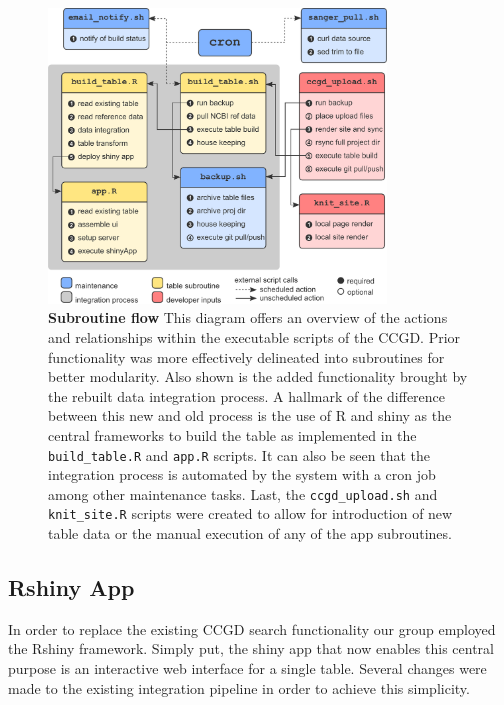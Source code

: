 \documentclass[10pt]{report}
\begin{document}
\begin{figure}[H]
    \center{}
    \includegraphics[width=0.8\textwidth]{fig/subroutine_flow.pdf}
    \caption[Subroutine flow]{\textbf{Subroutine flow} This diagram offers an overview of the actions and relationships within the executable scripts of the CCGD\@. Prior functionality was more effectively delineated into subroutines for better modularity. Also shown is the added functionality brought by the rebuilt data integration process. A hallmark of the difference between this new and old process is the use of R and shiny as the central frameworks to build the table as implemented in the \texttt{build\_table.R} and \texttt{app.R} scripts. It can also be seen that the integration process is automated by the system with a cron job among other maintenance tasks. Last, the \texttt{ccgd\_upload.sh} and \texttt{knit\_site.R} scripts were created to allow for introduction of new table data or the manual execution of any of the app subroutines.}\label{fig:subroutine}
\end{figure}

\subsection{Rshiny App}
In order to replace the existing CCGD search functionality our group employed the Rshiny framework. Simply put, the shiny app that now enables this central purpose is an interactive web interface for a single table. Several changes were made to the existing integration pipeline in order to achieve this simplicity.
\end{document}
